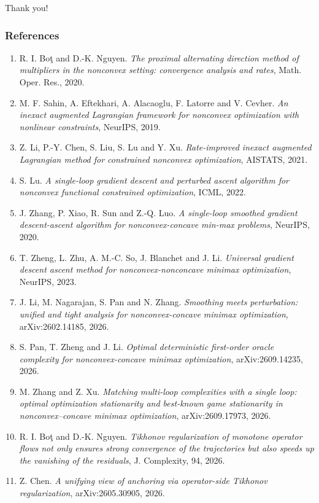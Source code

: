\documentclass[10pt]{beamer}
\newcommand{\blue}[1]{{\usebeamercolor[fg]{frametitle}#1}}
\begin{document}
\begin{frame}
\vfill
\centering
{\Large \blue{Thank you!}}
\vfill
\end{frame}

\begin{frame}\frametitle{References}
\scriptsize
\begin{enumerate}
  \item R. I. Bo\c{t} and D.-K. Nguyen. \emph{The proximal alternating direction method of multipliers in the nonconvex setting: convergence analysis and rates}, Math. Oper. Res., 2020.
  \item M. F. Sahin, A. Eftekhari, A. Alacaoglu, F. Latorre and V. Cevher. \emph{An inexact augmented Lagrangian framework for nonconvex optimization with nonlinear constraints}, NeurIPS, 2019.
  \item Z. Li, P.-Y. Chen, S. Liu, S. Lu and Y. Xu. \emph{Rate-improved inexact augmented Lagrangian method for constrained nonconvex optimization}, AISTATS, 2021.
  \item S. Lu. \emph{A single-loop gradient descent and perturbed ascent algorithm for nonconvex functional constrained optimization}, ICML, 2022.
  \item J. Zhang, P. Xiao, R. Sun and Z.-Q. Luo. \emph{A single-loop smoothed gradient descent-ascent algorithm for nonconvex-concave min-max problems}, NeurIPS, 2020.
  \item T. Zheng, L. Zhu, A. M.-C. So, J. Blanchet and J. Li. \emph{Universal gradient descent ascent method for nonconvex-nonconcave minimax optimization}, NeurIPS, 2023.
  \item J. Li, M. Nagarajan, S. Pan and N. Zhang. \emph{Smoothing meets perturbation: unified and tight analysis for nonconvex-concave minimax optimization}, arXiv:2602.14185, 2026.
  \item S. Pan, T. Zheng and J. Li. \emph{Optimal deterministic first-order oracle complexity for nonconvex-concave minimax optimization}, arXiv:2609.14235, 2026.
  \item M. Zhang and Z. Xu. \emph{Matching multi-loop complexities with a single loop: optimal optimization stationarity and best-known game stationarity in nonconvex--concave minimax optimization}, arXiv:2609.17973, 2026.
  \item R. I. Bo\c{t} and D.-K. Nguyen. \emph{Tikhonov regularization of monotone operator flows not only ensures strong convergence of the trajectories but also speeds up the vanishing of the residuals}, J. Complexity, 94, 2026.
  \item Z. Chen. \emph{A unifying view of anchoring via operator-side Tikhonov regularization}, arXiv:2605.30905, 2026.
\end{enumerate}
\end{frame}
\end{document}
